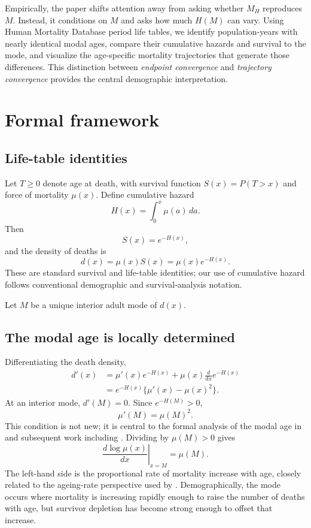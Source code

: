 \documentclass[doublespace]{interact}
\begin{document}
Empirically, the paper shifts attention away from asking whether $M_H$ reproduces $M$. Instead, it conditions on $M$ and asks how much $H(M)$ can vary. Using Human Mortality Database period life tables, we identify population-years with nearly identical modal ages, compare their cumulative hazards and survival to the mode, and visualize the age-specific mortality trajectories that generate those differences. This distinction between \emph{endpoint convergence} and \emph{trajectory convergence} provides the central demographic interpretation.

\section{Formal framework}

\subsection{Life-table identities}

Let $T\geq0$ denote age at death, with survival function $S(x)=P(T>x)$ and force of mortality $\mu(x)$. Define cumulative hazard
\begin{equation}
H(x)=\int_0^x\mu(a)\,da.
\end{equation}
Then
\begin{equation}
S(x)=e^{-H(x)},
\end{equation}
and the density of deaths is
\begin{equation}
d(x)=\mu(x)S(x)=\mu(x)e^{-H(x)}.
\end{equation}
These are standard survival and life-table identities; our use of cumulative hazard follows conventional demographic and survival-analysis notation.

Let $M$ be a unique interior adult mode of $d(x)$.

\subsection{The modal age is locally determined}

Differentiating the death density,
\begin{align}
d'(x)
&=\mu'(x)e^{-H(x)}+\mu(x)\frac{d}{dx}e^{-H(x)}\\
&=e^{-H(x)}\{\mu'(x)-\mu(x)^2\}.
\end{align}
At an interior mode, $d'(M)=0$. Since $e^{-H(M)}>0$,
\begin{equation}
\boxed{\mu'(M)=\mu(M)^2.}
\end{equation}
This condition is not new; it is central to the formal analysis of the modal age in \citet{CanudasRomo2008} and subsequent work including \citet{MissovEtAl2015}. Dividing by $\mu(M)>0$ gives
\begin{equation}
\boxed{\left.\frac{d\log\mu(x)}{dx}\right|_{x=M}=\mu(M).}
\end{equation}
The left-hand side is the proportional rate of mortality increase with age, closely related to the ageing-rate perspective used by \citet{HoriuchiCoale1990}. Demographically, the mode occurs where mortality is increasing rapidly enough to raise the number of deaths with age, but survivor depletion has become strong enough to offset that increase.
\end{document}
